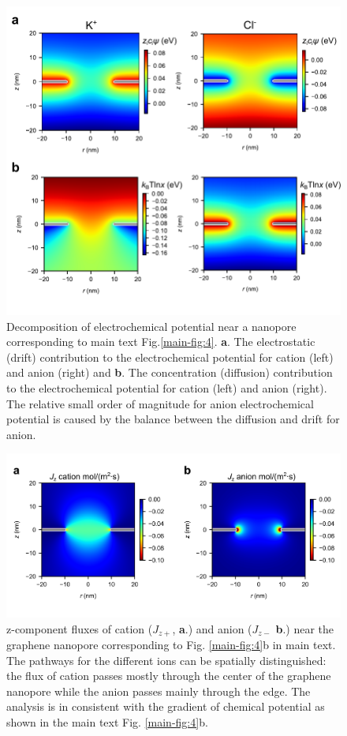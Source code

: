 \documentclass[manuscript=suppinfo,email=true, hyperref=true, keywords=false]{achemso}
\newcommand{\Fig}{Fig.}
\begin{document}
\begin{figure}[htbp]
  \centering
  \includegraphics[width=0.8\linewidth]{img/SI-electrochemical-decomposite.pdf}
  \caption{Decomposition of electrochemical potential near a nanopore
    corresponding to main text \Fig \ref{main-fig:4}. \textbf{a}. The electrostatic
    (drift) contribution to the electrochemical potential for cation
    (left) and anion (right) and \textbf{b}. The concentration (diffusion)
    contribution to the electrochemical potential for cation (left)
    and anion (right). The relative small order of magnitude for anion
    electrochemical potential is caused by the balance between the
    diffusion and drift for anion.}
  \label{fig:potential}
\end{figure}

\begin{figure}[htbp]
  \centering
  \includegraphics[width=0.8\linewidth]{img/SI-flux.png}
  \caption{z-component fluxes of cation ($J_{z+}$, \textbf{a}.)  and
    anion ($J_{z-}$ \textbf{b}.) near the graphene nanopore
    corresponding to \Fig{} \ref{main-fig:4}b in main text. The
    pathways for the different ions can be spatially distinguished:
    the flux of cation passes mostly through the center of the
    graphene nanopore while the anion passes mainly through the
    edge. The analysis is in consistent with the gradient of chemical
    potential as shown in the main text \Fig{} \ref{main-fig:4}b.}
  \label{fig:flux}
\end{figure}
\end{document}
